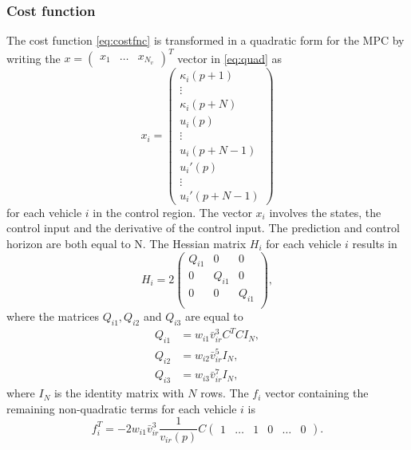 \documentclass[letterpaper,10pt,conference]{ieeeconf}
\begin{document}
\subsubsection{Cost function}
The cost function \eqref{eq:costfnc} is transformed in a quadratic form for the MPC by writing the $x=\begin{pmatrix}x_1&\dots&x_{N_v}  \end{pmatrix}^T$ vector in \eqref{eq:quad} as
\begin{equation}
x_i=\begin{pmatrix}
\kappa_i(p+1)\\\vdots\\ \kappa_i(p+N)\\ u_i(p) \\ \vdots \\ u_i(p+N-1)\\ u_i'(p)\\ \vdots \\ u_i'(p+N-1)
\end{pmatrix}
\end{equation}
for each vehicle $i$ in the control region. The vector $x_i$ involves the states, the control input and the derivative of the control input. The prediction and control horizon are both equal to N. The Hessian matrix $H_i$ for each vehicle $i$ results in
\begin{equation}\label{eq:hessian}
H_i = 2
\begin{pmatrix}
    Q_{i1} & 0 & 0 \\
    0 & Q_{i1} & 0 \\
    0 & 0 & Q_{i1} \\
\end{pmatrix},
\end{equation}
where the matrices $Q_{i1}, Q_{i2}$ and $Q_{i3}$ are equal to
\begin{subequations}
\begin{align}
Q_{i1} &= w_{i1}\bar{v}_{ir}^3 C^TC I_N, \\
Q_{i2} &=  w_{i2}\bar{v}_{ir}^5I_N ,\\
Q_{i3} &= w_{i3}\bar{v}_{ir}^7I_N,
\end{align}
\end{subequations}
where $I_N$ is the identity matrix with $N$ rows.
The $f_i$ vector containing the remaining non-quadratic terms for each vehicle $i$ is
\begin{equation}
f_i^T = -2w_{i1}\bar{v}_{ir}^3\frac{1}{v_{ir}(p)}C
\begin{pmatrix}
1 & \hdots & 1 & 0 & \hdots & 0
\end{pmatrix}\label{eq:fvec}.
\end{equation}
\end{document}
